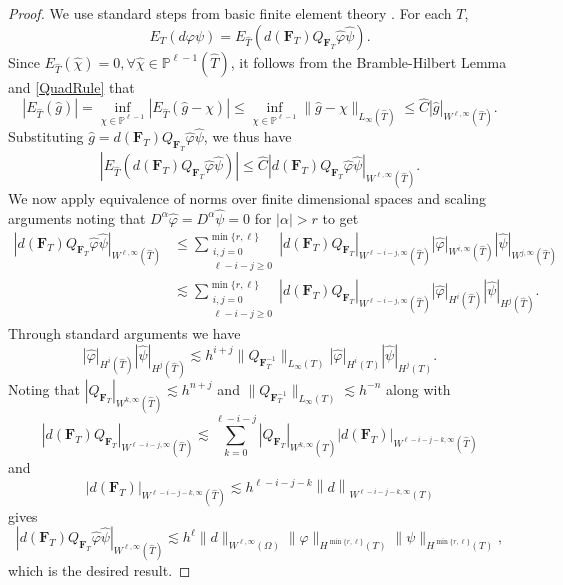\documentclass{siamart0516}
\newcommand{\bF}{\ensuremath{\boldsymbol F}}
\numberwithin{equation}{section}
\numberwithin{theorem}{section}
\numberwithin{figure}{section}
\begin{document}
\begin{proof}
We use standard steps from basic finite element theory \cite{Ciar02}.  For each $T$,
	\begin{equation}
		E_T(d\varphi\psi) =E_{\hat{T}}\left(d(\bF_T)Q_{\bF_T}\hat{\varphi}\hat{\psi}\right).
		\label{QuadErr}
	\end{equation}
	Since $E_{\hat{T}}(\hat{\chi})=0, \forall \hat{\chi}\in \mathbb{P}^{\ell-1}(\hat{T})$, it follows from the Bramble-Hilbert Lemma and \eqref{QuadRule} that 
	$$
	|E_{\hat{T}}(\hat{g})| = \inf_{\chi\in \mathbb{P}^{\ell-1}}|E_{\hat{T}}(\hat{g}-\chi)| \leq \inf_{\chi\in \mathbb{P}^{\ell-1}}\|\hat{g}-\chi\|_{L_\infty(\hat{T})}\leq \hat{C}|\hat{g}|_{W^{\ell,\infty}(\hat{T})}.
	$$
	Substituting $\hat{g}=d(\bF_T)Q_{\bF_T}\hat{\varphi}\hat{\psi}$, we thus have
	$$
	\left|E_{\hat{T}}\left(d(\bF_T)Q_{\bF_T}\hat{\varphi}\hat{\psi}\right)\right|\leq \hat{C}\left|d(\bF_T)Q_{\bF_T}\hat{\varphi}\hat{\psi}\right|_{W^{\ell,\infty}(\hat{T})}.
	$$
	We now apply equivalence of norms over finite dimensional spaces and scaling arguments noting that $D^\alpha\hat{\varphi}=D^\alpha\hat{\psi}=0$ for $|\alpha|>r$ to get 
	\begin{align*}
	\left|d(\bF_T)Q_{\bF_T}\hat{\varphi}\hat{\psi}\right|_{W^{\ell,\infty}(\hat{T})} &\leq \sum_{\substack{i,j=0\\ \ell-i-j\geq 0}}^{\min\{r,\ell\}}\left|d(\bF_T)Q_{\bF_T}\right|_{W^{\ell-i-j,\infty}(\hat{T})}|\hat{\varphi}|_{W^{i,\infty}(\hat{T})}|\hat{\psi}|_{W^{j,\infty}(\hat{T})}
\\
	&\lesssim \sum_{\substack{i,j=0\\ \ell-i-j\geq 0}}^{\min\{r,\ell\}}\left|d(\bF_T)Q_{\bF_T}\right|_{W^{\ell-i-j,\infty}(\hat{T})}|\hat{\varphi}|_{H^{i}(\hat{T})}|\hat{\psi}|_{H^{j}(\hat{T})}.
	\end{align*}
Through standard arguments we have
$$	
|\hat{\varphi}|_{H^{i}(\hat{T})}|\hat{\psi}|_{H^{j}(\hat{T})}
\lesssim 
h^{i+j}\|Q_{\bF_T^{-1}}\|_{L_{\infty}(T)}|\hat{\varphi}|_{H^{i}(T)}|\hat{\psi}|_{H^{j}(T)}.
$$
Noting that $\left|Q_{\bF_T}\right|_{W^{k,\infty}(\hat{T})}\lesssim h^{n+j}$ and $\|Q_{\bF_T^{-1}}\|_{L_{\infty}(T)}\lesssim h^{-n}$	along with 
	$$
	\left|d(\bF_T)Q_{\bF_T}\right|_{W^{\ell-i-j,\infty}(\hat{T})}
	\lesssim
	\sum_{k=0}^{\ell-i-j}\left|Q_{\bF_T}\right|_{W^{k,\infty}(\hat{T})}\left|d(\bF_T)\right|_{W^{\ell-i-j-k,\infty}(\hat{T})}
	$$
and	
	$$
	\left|d(\bF_T)\right|_{W^{\ell-i-j-k,\infty}(\hat{T})}
	\lesssim
	h^{\ell-i-j-k}\left\|d\right\|_{W^{\ell-i-j-k,\infty}(T)}
	$$
gives
$$
\left|d(\bF_T)Q_{\bF_T}\hat{\varphi}\hat{\psi}\right|_{W^{\ell,\infty}(\hat{T})}
\lesssim
h^{\ell}\|d\|_{W^{\ell,\infty}(\Omega)}\|\varphi\|_{H^{\min\{r,\ell\}}(T)}\|\psi\|_{H^{\min\{r,\ell\}}(T)},
$$	
which is the desired result.
\end{proof}
\end{document}
